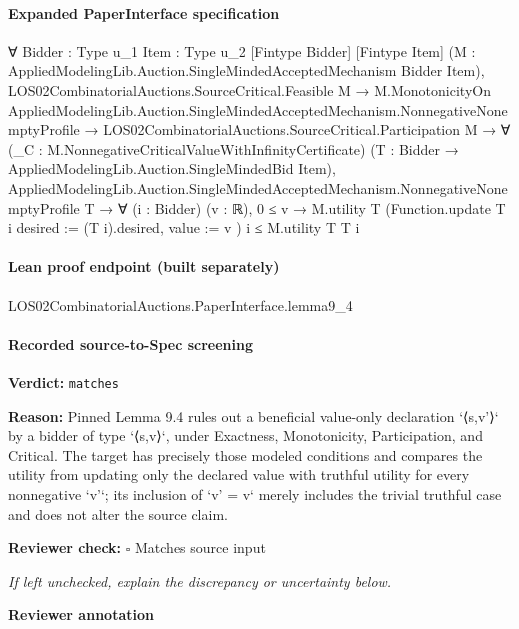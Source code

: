 \documentclass[10pt]{article}
\newcommand{\reviewerbox}{%
  \par\noindent\fbox{\parbox{0.96\linewidth}{\rule{0pt}{0.38in}}}\par
}
\newcommand{\reviewmatch}[1]{%
  \par\noindent\textbf{Reviewer check:} $\square$\; #1\par
  \noindent\emph{If left unchecked, explain the discrepancy or uncertainty below.}\par
}
\begin{document}
\paragraph{Expanded PaperInterface specification}
\begin{ReviewVerbatim}
∀ {Bidder : Type u_1} {Item : Type u_2} [Fintype Bidder] [Fintype Item]
  (M : AppliedModelingLib.Auction.SingleMindedAcceptedMechanism Bidder Item),
  LOS02CombinatorialAuctions.SourceCritical.Feasible M →
    M.MonotonicityOn AppliedModelingLib.Auction.SingleMindedAcceptedMechanism.NonnegativeNonemptyProfile →
      LOS02CombinatorialAuctions.SourceCritical.Participation M →
        ∀ (_C : M.NonnegativeCriticalValueWithInfinityCertificate)
          (T : Bidder → AppliedModelingLib.Auction.SingleMindedBid Item),
          AppliedModelingLib.Auction.SingleMindedAcceptedMechanism.NonnegativeNonemptyProfile T →
            ∀ (i : Bidder) (v : ℝ),
              0 ≤ v → M.utility T (Function.update T i { desired := (T i).desired, value := v }) i ≤ M.utility T T i
\end{ReviewVerbatim}



\paragraph{Lean proof endpoint (built separately)}\begin{ReviewVerbatim}
LOS02CombinatorialAuctions.PaperInterface.lemma9_4
\end{ReviewVerbatim}

\paragraph{Recorded source-to-Spec screening}
\textbf{Verdict:} \texttt{matches}
\\
{\raggedright
\textbf{Reason:} Pinned Lemma 9.\allowbreak{}4 rules out a beneficial value-\allowbreak{}only declaration `⟨s,v'⟩` by a bidder of type `⟨s,v⟩`, under Exactness, Monotonicity, Participation, and Critical.\allowbreak{} The target has precisely those modeled conditions and compares the utility from updating only the declared value with truthful utility for every nonnegative `v'`;\allowbreak{} its inclusion of `v' = v` merely includes the trivial truthful case and does not alter the source claim.\allowbreak{}
\par}
\reviewmatch{Matches source input}
\noindent\textbf{Reviewer annotation}\par
\reviewerbox
\clearpage
\hypertarget{source-claim-dc86e81c23850384}{}
\end{document}
